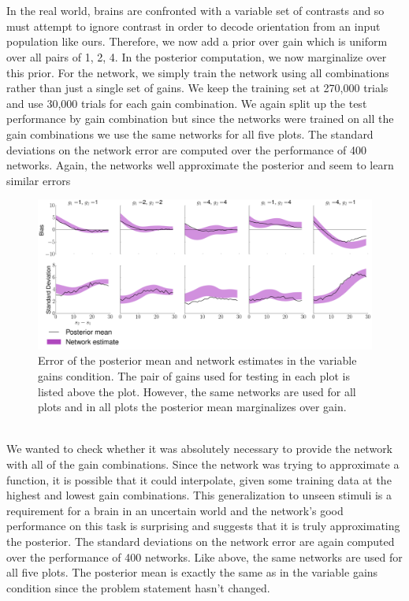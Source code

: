 \documentclass{article} %
\begin{document}
\\
\\
In the real world, brains are confronted with a variable set of contrasts and so must attempt to ignore contrast in order to decode orientation from an input population like ours. Therefore, we now add a prior over gain which is uniform over all pairs of {1, 2, 4}. In the posterior computation, we now marginalize over this prior. For the network, we simply train the network using all combinations rather than just a single set of gains. We keep the training set at 270,000 trials and use 30,000 trials for each gain combination. We again split up the test performance by gain combination but since the networks were trained on all the gain combinations we use the same networks for all five plots. The standard deviations on the network error are computed over the performance of 400 networks. Again, the networks well approximate the posterior and seem to learn similar errors
\begin{figure}[h]
\centering
\includegraphics[width = \textwidth]{Variable_Gains.png}
\caption{Error of the posterior mean and network estimates in the variable gains condition. The pair of gains used for testing in each plot is listed above the plot. However, the same networks are used for all plots and in all plots the posterior mean marginalizes over gain.}
\end{figure}
\\
We wanted to check whether it was absolutely necessary to provide the network with all of the gain combinations. Since the network was trying to approximate a function, it is possible that it could interpolate, given some training data at the highest and lowest gain combinations. This generalization to unseen stimuli is a requirement for a brain in an uncertain world and the network's good performance on this task is surprising and suggests that it is truly approximating the posterior. The standard deviations on the network error are again computed over the performance of 400 networks. Like above, the same networks are used for all five plots. The posterior mean is exactly the same as in the variable gains condition since the problem statement hasn't changed.
\end{document}
